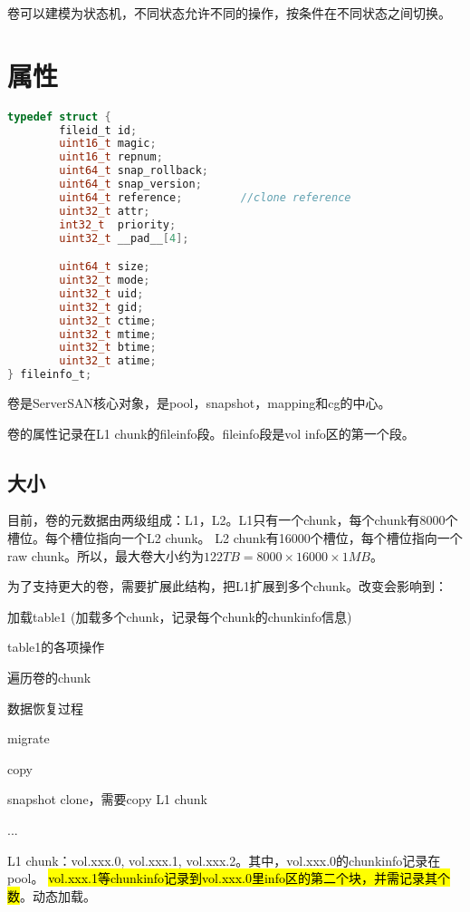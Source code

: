 卷可以建模为状态机，不同状态允许不同的操作，按条件在不同状态之间切换。

\section{属性}

\begin{lstlisting}[language=c,frame=single]
typedef struct {
        fileid_t id;
        uint16_t magic;
        uint16_t repnum;
        uint64_t snap_rollback;
        uint64_t snap_version;
        uint64_t reference;         //clone reference
        uint32_t attr;
        int32_t  priority;
        uint32_t __pad__[4];

        uint64_t size;
        uint32_t mode;
        uint32_t uid;
        uint32_t gid;
        uint32_t ctime;
        uint32_t mtime;
        uint32_t btime;
        uint32_t atime;
} fileinfo_t;
\end{lstlisting}

卷是ServerSAN核心对象，是pool，snapshot，mapping和cg的中心。

卷的属性记录在L1 chunk的fileinfo段。fileinfo段是vol info区的第一个段。

\subsection{大小}

目前，卷的元数据由两级组成：L1，L2。L1只有一个chunk，每个chunk有8000个槽位。每个槽位指向一个L2 chunk。
L2 chunk有16000个槽位，每个槽位指向一个raw chunk。所以，最大卷大小约为$122TB = 8000 \times 16000 \times 1MB$。

为了支持更大的卷，需要扩展此结构，把L1扩展到多个chunk。改变会影响到：
\begin{compactitem}
\item 加载table1 (加载多个chunk，记录每个chunk的chunkinfo信息)
\item table1的各项操作
\item 遍历卷的chunk
\item 数据恢复过程
\item migrate
\item copy
\item snapshot clone，需要copy L1 chunk
\item ...
\end{compactitem}

L1 chunk：vol.xxx.0, vol.xxx.1, vol.xxx.2。其中，vol.xxx.0的chunkinfo记录在pool。
\hl{vol.xxx.1等chunkinfo记录到vol.xxx.0里info区的第二个块，并需记录其个数}。动态加载。


